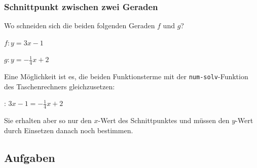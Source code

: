 \subsubsection{Schnittpunkt zwischen zwei Geraden}

Wo schneiden sich die beiden folgenden Geraden $f$ und $g$?

$f: y=3x - 1$

$g: y=-\frac14x +2$

Eine Möglichkeit ist es, die beiden Funktionsterme mit
der \texttt{num-solv}-Funktion des Taschenrechners gleichzusetzen:

: $3x-1 = -\frac14x+2$

Sie erhalten aber so nur den $x$-Wert des Schnittpunktes und müssen
den $y$-Wert durch Einsetzen danach noch bestimmen.



\subsection*{Aufgaben}

\newpage
